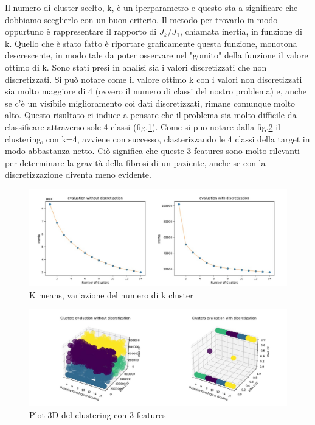 Il numero di cluster scelto, k, è un iperparametro e questo sta a significare che dobbiamo sceglierlo con un buon criterio. Il metodo per trovarlo in modo oppurtuno è rappresentare il rapporto di \begin{math}J_k/J_1\end{math}, chiamata inertia, in funzione di k. Quello che è stato fatto è riportare graficamente questa funzione, monotona descrescente, in modo tale da poter osservare nel "gomito" della funzione il valore ottimo di k. Sono stati presi in analisi sia i valori discretizzati che non discretizzati. Si può notare come il valore ottimo k con i valori non discretizzati sia molto maggiore di 4 (ovvero il numero di classi del nostro problema) e, anche se c'è un visibile miglioramento coi dati discretizzati, rimane comunque molto alto. Questo risultato ci induce a pensare che il problema sia molto difficile da classificare attraverso sole 4 classi (fig.\ref{fig:k_means1}). 
Come si puo notare dalla fig.\ref{fig:k_means2} il clustering, con k=4, avviene con successo, clasterizzando le 4 classi della target in modo abbastanza netto. Ciò significa che queste 3 features sono molto rilevanti per determinare la gravità della fibrosi di un paziente, anche se con la discretizzazione diventa meno evidente.

\begin{figure}[H]
    \centering
    \includegraphics[width=1\columnwidth]{figures/Kmeans_K.jpg}
    \caption{K means, variazione del numero di k cluster}
    \label{fig:k_means1}
\end{figure}
\begin{figure}[H]
    \centering
    \includegraphics[width=1\columnwidth]{figures/clusters.jpg}
    \caption{Plot 3D del clustering con 3 features}
    \label{fig:k_means2}
\end{figure}

